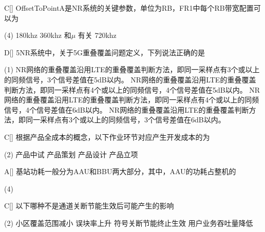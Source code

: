 

\begin{choice}{C}[]
    OffsetToPointA是NR系统的关键参数，单位为RB，FR1中每个RB带宽配置可以为
    \begin{tasks}(4)
        \task 180khz
        \task 360khz
        \task 和$\mu$ 有关
        \task 720khz
    \end{tasks}
\end{choice}


\begin{choice}{D}[]
    5NR系统中，关于5G重叠覆盖问题定义，下列说法正确的是
    \begin{tasks}(1)
        \task NR网络的重叠覆盖沿用LTE的重叠覆盖判断方法，即同一采样点有3个或以上的同频信号，3个信号差值在5dB以内。
        \task NR网络的重叠覆盖沿用LTE的重叠覆盖判断方法，即同一采样点有4个或以上的同频信号，4个信号差值在5dB以内。
        \task NR网络的重叠覆盖沿用LTE的重叠覆盖判断方法，即同一采样点有4个或以上的同频信号，4个信号差值在6dB以内。
        \task NR网络的重叠覆盖沿用LTE的重叠覆盖判断方法，即同一采样点有3个或以上的同频信号，3个信号差值在6dB以内。
    \end{tasks}
\end{choice}



\begin{choice}{C}[]
    根据产品全成本的概念，以下作业环节对应产生开发成本的为
    \begin{tasks}(2)
        \task 产品中试
        \task 产品策划
        \task 产品设计
        \task 产品立项
    \end{tasks}
\end{choice}



\begin{choice}{A}[]
    基站功耗一般分为AAU和BBU两大部分，其中，AAU的功耗占整机的
    \begin{tasks}(4)
    \end{tasks}
\end{choice}




\begin{choice}{C}[]
    以下哪种不是通道关断节能生效后可能产生的影响
    \begin{tasks}(2)
        \task 小区覆盖范围减小
        \task 误块率上升
        \task 符号关断节能终止生效
        \task 用户业务吞吐量降低
    \end{tasks}
\end{choice}

